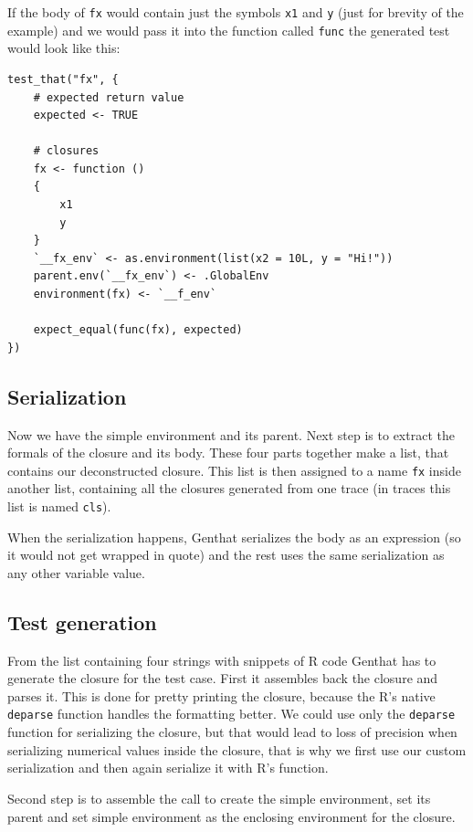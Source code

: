 \documentclass[thesis=B,english]{FITthesis}[2012/10/20]
\begin{document}
If the body of \verb|fx| would contain just the symbols \verb|x1| and \verb|y| (just for brevity of the example) and we would pass it into the function called \verb|func| the generated test would look like this:

\begin{verbatim}
test_that("fx", {
    # expected return value
    expected <- TRUE

    # closures
    fx <- function ()
    {
        x1
        y
    }
    `__fx_env` <- as.environment(list(x2 = 10L, y = "Hi!"))
    parent.env(`__fx_env`) <- .GlobalEnv
    environment(fx) <- `__f_env`

    expect_equal(func(fx), expected)
})
\end{verbatim}

\subsection{Serialization}
Now we have the simple environment and its parent. Next step is to extract the formals of the closure and its body. These four parts together make a list, that contains our deconstructed closure. This list is then assigned to a name \verb|fx| inside another list, containing all the closures generated from one trace (in traces this list is named \verb|cls|).

When the serialization happens, Genthat serializes the body as an expression (so it would not get wrapped in quote) and the rest uses the same serialization as any other variable value.

\subsection{Test generation}
From the list containing four strings with snippets of R code Genthat has to generate the closure for the test case. First it assembles back the closure and parses it. This is done for pretty printing the closure, because the R’s native \verb|deparse| function handles the formatting better. We could use only the \verb|deparse| function for serializing the closure, but that would lead to loss of precision when serializing numerical values inside the closure, that is why we first use our custom serialization and then again serialize it with R’s function.

Second step is to assemble the call to create the simple environment, set its parent and set simple environment as the enclosing environment for the closure.
\end{document}
